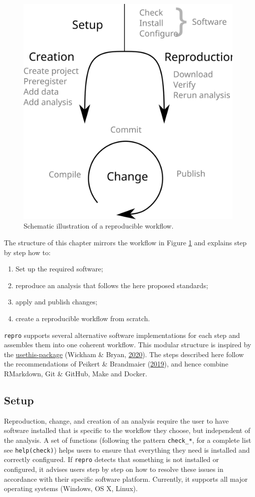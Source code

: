 \documentclass[12pt,a4paper,]{article}
\providecommand{\tightlist}{%
  \setlength{\itemsep}{0pt}\setlength{\parskip}{0pt}}
\begin{document}
\begin{figure}

{\centering \includegraphics[width=0.5\linewidth]{images/idealized-workflow} 

}

\caption{Schematic illustration of a reproducible workflow.  }\label{fig:workflow}
\end{figure}

The structure of this chapter mirrors the workflow in Figure \ref{fig:workflow} and explains step by step how to:

\begin{enumerate}
\def\labelenumi{\arabic{enumi}.}
\tightlist
\item
  Set up the required software;
\item
  reproduce an analysis that follows the here proposed standards;
\item
  apply and publish changes;
\item
  create a reproducible workflow from scratch.
\end{enumerate}

\texttt{repro} supports several alternative software implementations for each step and assembles them into one coherent workflow.
This modular structure is inspired by the \href{https://usethis.r-lib.org}{usethis-package} (Wickham \& Bryan, \protect\hyperlink{ref-R-usethis}{2020}).
The steps described here follow the recommendations of Peikert \& Brandmaier (\protect\hyperlink{ref-peikertReproducibleDataAnalysis2019}{2019}), and hence combine RMarkdown, Git \& GitHub, Make and Docker.

\hypertarget{setup}{%
\subsection{Setup}\label{setup}}

Reproduction, change, and creation of an analysis require the user to have software installed that is specific to the workflow they choose, but independent of the analysis.
A set of functions (following the pattern \texttt{check\_*}, for a complete list see \texttt{help(check)}) helps users to ensure that everything they need is installed and correctly configured.
If \texttt{repro} detects that something is not installed or configured, it advises users step by step on how to resolve these issues in accordance with their specific software platform.
Currently, it supports all major operating systems (Windows, OS X, Linux).
\end{document}
